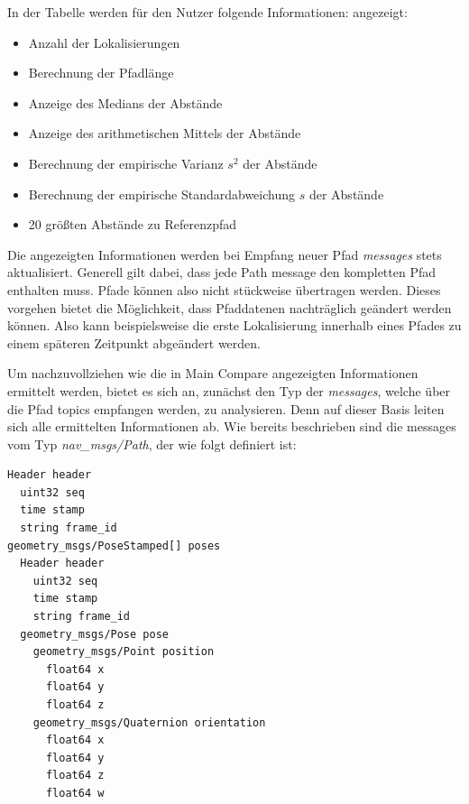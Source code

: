 In der Tabelle werden für den Nutzer folgende Informationen:
angezeigt:

\begin{itemize}
  \item Anzahl der Lokalisierungen
  \item Berechnung der Pfadlänge
  \item Anzeige des Medians der Abstände
  \item Anzeige des arithmetischen Mittels der Abstände
  \item Berechnung der empirische Varianz $s^2$ der Abstände
  \item Berechnung der empirische Standardabweichung $s$ der Abstände
  \item 20 größten Abstände zu Referenzpfad
\end{itemize}

Die angezeigten Informationen werden bei Empfang neuer Pfad \textit{messages} stets
aktualisiert. Generell gilt dabei, dass jede Path message den kompletten Pfad
enthalten muss. Pfade können also nicht stückweise übertragen werden. Dieses vorgehen
bietet die Möglichkeit, dass Pfaddatenen nachträglich geändert werden können.
Also kann beispielsweise die erste Lokalisierung innerhalb eines Pfades zu einem
späteren Zeitpunkt abgeändert werden. 

Um nachzuvollziehen wie die in Main Compare angezeigten Informationen ermittelt werden, bietet
es sich an, zunächst den Typ der \textit{messages}, welche über die Pfad topics
empfangen werden, zu analysieren. Denn auf dieser Basis leiten sich alle
ermittelten Informationen ab. Wie bereits beschrieben sind die messages vom Typ
\textit{nav\_msgs/Path}, der wie folgt definiert ist:

\begin{lstlisting}[caption=ROS transformation message, label=lst:pathmsgs]
Header header
  uint32 seq
  time stamp
  string frame_id
geometry_msgs/PoseStamped[] poses
  Header header
    uint32 seq
    time stamp
    string frame_id
  geometry_msgs/Pose pose
    geometry_msgs/Point position
      float64 x
      float64 y
      float64 z
    geometry_msgs/Quaternion orientation
      float64 x
      float64 y
      float64 z
      float64 w
\end{lstlisting}

